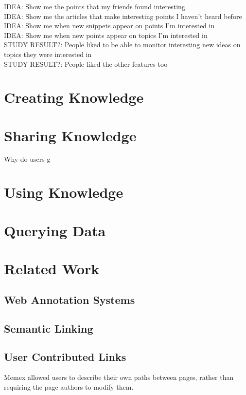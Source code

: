 \documentclass{sig-alt-release2}
\newcommand{\idea}[1]{{\color{blue} IDEA: #1}\\}
\newcommand{\studyresult}[1]{{\color{red} STUDY RESULT?: #1}\\}
\begin{document}
\idea{Show me the points that my friends found interesting}

\idea{Show me the articles that make interesting points I haven't heard before}

\idea{Show me when new snippets appear on points I'm interested in}

\idea{Show me when new points appear on topics I'm interested in}


\studyresult{People liked to be able to monitor interesting new ideas on topics they were interested in}

\studyresult{People liked the other features too}


\section{Creating Knowledge}

\section{Sharing Knowledge}

Why do users g

\section{Using Knowledge}

\section{Querying Data}

\section{Related Work}

\subsection{Web Annotation Systems}

\subsection{Semantic Linking}

\subsection{User Contributed Links}

Memex allowed users to describe their own paths between pages, rather than requiring the page authors to modify them.
\end{document}
